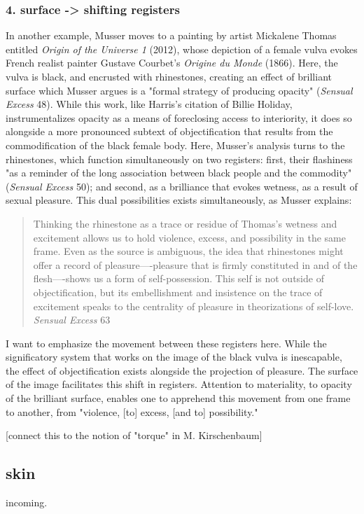 \documentclass[11pt]{article}
\begin{document}
\subsubsection{4. surface -> shifting registers}
\label{sec:org14bc0e6}
In another example, Musser moves to a painting by artist Mickalene
Thomas entitled \emph{Origin of the Universe 1} (2012), whose depiction of
a female vulva evokes French realist painter Gustave Courbet's
\emph{Origine du Monde} (1866). Here, the vulva is black, and encrusted
with rhinestones, creating an effect of brilliant surface which Musser
argues is a "formal strategy of producing opacity" (\emph{Sensual Excess}
48). While this work, like Harris's citation of Billie Holiday,
instrumentalizes opacity as a means of foreclosing access to
interiority, it does so alongside a more pronounced subtext of
objectification that results from the commodification of the black
female body. Here, Musser's analysis turns to the rhinestones, which
function simultaneously on two registers: first, their flashiness "as
a reminder of the long association between black people and the
commodity" (\emph{Sensual Excess} 50); and second, as a brilliance that
evokes wetness, as a result of sexual pleasure. This dual possibilities
exists simultaneously, as Musser explains:
\begin{quote}
Thinking the rhinestone as a trace or residue of Thomas’s wetness and
excitement allows us to hold violence, excess, and possibility in the
same frame. Even as the source is ambiguous, the idea that rhinestones
might offer a record of pleasure—-pleasure that is firmly constituted
in and of the flesh—-shows us a form of self-possession.  This self is
not outside of objectification, but its embellishment and insistence
on the trace of excitement speaks to the centrality of pleasure in
theorizations of self-love. \emph{Sensual Excess} 63
\end{quote}
I want to emphasize the movement between these registers here. While
the significatory system that works on the image of the black vulva is
inescapable, the effect of objectification exists alongside the
projection of pleasure. The surface of the image facilitates this
shift in registers. Attention to materiality, to opacity of the
brilliant surface, enables one to apprehend this movement from one
frame to another, from "violence, [to] excess, [and to] possibility."

[connect this to the notion of "torque" in M. Kirschenbaum]

\subsection{skin}
\label{sec:org9243bee}
incoming. 
\end{document}
